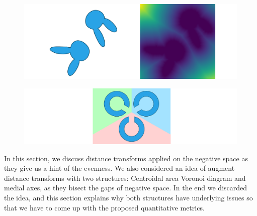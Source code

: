 \begin{figure}[ht]
\centering
\includegraphics[width=1.0\textwidth]{figures/metrics/rabbit.pdf}
\caption[An example of distance transform of negative space]
{\label{fig_distance_transform}
  }
\end{figure}

\begin{figure}[t]
\centering
\includegraphics[width=1.0\textwidth]{figures/metrics/cs.pdf}
\caption[A Voronoi diagram of three ``C'' shapes]
{\label{fig_cs}
  }
\end{figure}

\newtext
{
In this section, we discuss distance transforms applied on the negative space as they give us a hint of the evenness.
We also considered an idea of augment distance transforms with two structures: Centroidal area Voronoi diagram and medial axes,
as they bisect the gaps of negative space.
In the end we discarded the idea, and this section explains why both structures have underlying issues 
so that we have to come up with the proposed quantitative metrics.
}

